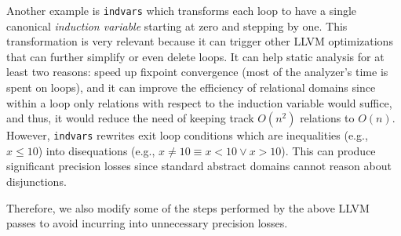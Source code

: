 \documentclass[a4]{article}
\begin{document}
Another example is \texttt{indvars} which transforms each loop to have
a single canonical \emph{induction variable} starting at zero and
stepping by one. This transformation is very relevant because it can
trigger other LLVM optimizations that can further simplify or even
delete loops. It can help static analysis for at least two reasons:
speed up fixpoint convergence (most of the analyzer's time is spent on
loops), and it can improve the efficiency of relational domains since
within a loop only relations with respect to the induction variable
would suffice, and thus, it would reduce the need of keeping track
$O(n^{2})$ relations to $O(n)$. However, \texttt{indvars} rewrites
exit loop conditions which are inequalities (e.g., $x \leq 10$) into
disequations (e.g., $ x \neq 10 \equiv x < 10 \vee x > 10$). This can
produce significant precision losses since standard abstract domains
cannot reason about disjunctions.

Therefore, we also modify some of the steps performed by the above
LLVM passes to avoid incurring into unnecessary precision losses.
\end{document}
